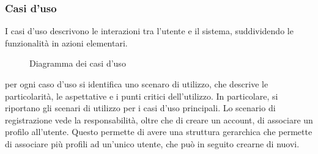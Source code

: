 \clearpage


\subsubsection{Casi d’uso}

I casi d’uso descrivono le interazioni tra l’utente e il sistema, suddividendo le funzionalità in azioni elementari.

\begin{figure}[h!]
    \centering
    \caption{Diagramma dei casi d'uso}
\end{figure}

per ogni caso d'uso si identifica uno scenaro di utilizzo, che descrive le particolarità, le aspettative e i punti critici dell'utilizzo.
In particolare, si riportano gli scenari di utilizzo per i casi d'uso principali.
\clearpage
Lo scenario di registrazione vede la responsabilità, oltre che di creare un account, di associare un profilo all'utente.
Questo permette di avere una struttura gerarchica che permette di associare più profili ad un'unico utente, che può in seguito crearne di nuovi.\\

